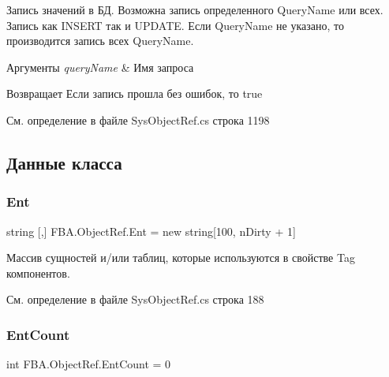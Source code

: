 Запись значений в БД. Возможна запись определенного Query\+Name или всех. Запись как I\+N\+S\+E\+RT так и U\+P\+D\+A\+TE. Если Query\+Name не указано, то производится запись всех Query\+Name. 


\begin{DoxyParams}{Аргументы}
{\em query\+Name} & Имя запроса\\
\hline
\end{DoxyParams}
\begin{DoxyReturn}{Возвращает}
Если запись прошла без ошибок, то true
\end{DoxyReturn}


См. определение в файле Sys\+Object\+Ref.\+cs строка 1198



\subsection{Данные класса}
\mbox{\label{class_f_b_a_1_1_object_ref_a684b661f5ba5955a3a03ffa8964ef16d}} 
\subsubsection{\texorpdfstring{Ent}{Ent}}
{\footnotesize\ttfamily string \mbox{[},\mbox{]} F\+B\+A.\+Object\+Ref.\+Ent = new string\mbox{[}100, n\+Dirty + 1\mbox{]}}



Массив сущностей и/или таблиц, которые используются в свойстве Tag компонентов. 



См. определение в файле Sys\+Object\+Ref.\+cs строка 188

\mbox{\label{class_f_b_a_1_1_object_ref_adbdded634ccfc383ecaad883519741cf}} 
\subsubsection{\texorpdfstring{Ent\+Count}{EntCount}}
{\footnotesize\ttfamily int F\+B\+A.\+Object\+Ref.\+Ent\+Count = 0}



